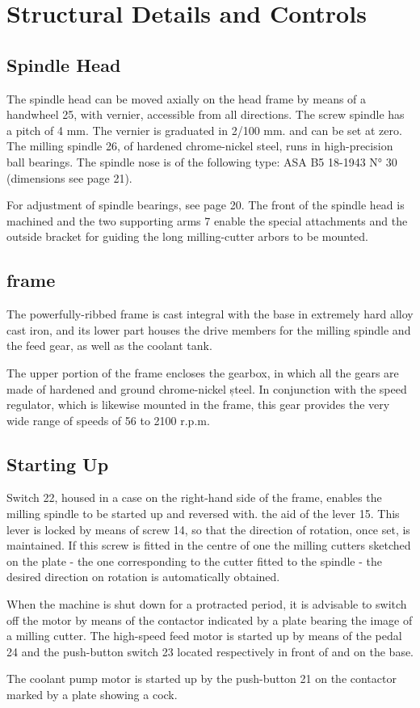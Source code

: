 \chapter{Structural Details and Controls}\label{chap:structural_characteristics_and_handling}

\section*{Spindle Head}

The spindle head can be moved axially on the head frame by means
of a handwheel 25, with vernier, accessible from all directions.
The screw spindle has a pitch of 4 mm. The vernier is graduated
in 2/100 mm. and can be set at zero. The milling spindle 26, of
hardened chrome-nickel steel, runs in high-precision ball bearings.
The spindle nose is of the following type: ASA B5 18-1943 N° 30
(dimensions see page 21).

For adjustment of spindle bearings, see page 20.
The front of the spindle head is machined and the two supporting
arms 7 enable the special attachments and the outside bracket
for guiding the long milling-cutter arbors to be mounted.

\section*{frame}

The powerfully-ribbed frame is cast integral with the base in
extremely hard alloy cast iron, and its lower part houses the
drive members for the milling spindle and the feed gear, as well
as the coolant tank.

The upper portion of the frame encloses the gearbox, in which
all the gears are made of hardened and ground chrome-nickel
șteel. In conjunction with the speed regulator, which is likewise
mounted in the frame, this gear provides the very wide range of
speeds of 56 to 2100 r.p.m.

\section*{Starting Up}

Switch 22, housed in a case on the right-hand side of the frame,
enables the milling spindle to be started up and reversed with.
the aid of the lever 15. This lever is locked by means of screw
14, so that the direction of rotation, once set, is maintained.
If this screw is fitted in the centre of one the milling cutters
sketched on the plate - the one corresponding to the cutter
fitted to the spindle - the desired direction on rotation is
automatically obtained.

When the machine is shut down for a protracted period, it is
advisable to switch off the motor by means of the contactor
indicated by a plate bearing the image of a milling cutter.
The high-speed feed motor is started up by means of the
pedal 24 and the push-button switch 23 located respectively in
front of and on the base.

The coolant pump motor is started up by the push-button 21 on
the contactor marked by a plate showing a cock.
